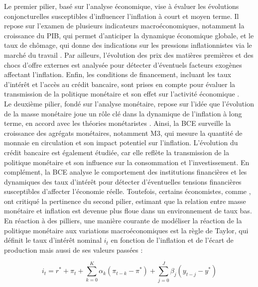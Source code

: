 Le premier pilier, basé sur l’analyse économique, vise à évaluer les évolutions conjoncturelles susceptibles d’influencer l’inflation à court et moyen terme. Il repose sur l’examen de plusieurs indicateurs macroéconomiques, notamment la croissance du PIB, qui permet d’anticiper la dynamique économique globale, et le taux de chômage, qui donne des indications sur les pressions inflationnistes via le marché du travail \citep{blanchard1986}. Par ailleurs, l’évolution des prix des matières premières et des chocs d’offre externes est analysée pour détecter d’éventuels facteurs exogènes affectant l’inflation. Enfin, les conditions de financement, incluant les taux d’intérêt et l’accès au crédit bancaire, sont prises en compte pour évaluer la transmission de la politique monétaire et son effet sur l’activité économique \citep{smets2003}.\\

Le deuxième pilier, fondé sur l’analyse monétaire, repose sur l’idée que l’évolution de la masse monétaire joue un rôle clé dans la dynamique de l’inflation à long terme, en accord avec les théories monétaristes \citep{friedman1968}. Ainsi, la BCE surveille la croissance des agrégats monétaires, notamment M3, qui mesure la quantité de monnaie en circulation et son impact potentiel sur l’inflation. L’évolution du crédit bancaire est également étudiée, car elle reflète la transmission de la politique monétaire et son influence sur la consommation et l’investissement. En complément, la BCE analyse le comportement des institutions financières et les dynamiques des taux d’intérêt pour détecter d’éventuelles tensions financières susceptibles d’affecter l’économie réelle. Toutefois, certains économistes, comme \citep{gali2008}, ont critiqué la pertinence du second pilier, estimant que la relation entre masse monétaire et inflation est devenue plus floue dans un environnement de taux bas.\\

En réaction à des pilliers, une manière courante de modéliser la réaction de la politique monétaire aux variations macroéconomiques est la règle de Taylor, qui définit le taux d'intérêt nominal $i_t$ en fonction de l'inflation et de l'écart de production mais aussi de ses valeurs passées :

\begin{equation}
i_t = r^* + \pi_t + \sum_{k=0}^{K} \alpha_k (\pi_{t-k} - \pi^*) + \sum_{j=0}^{J} \beta_j (y_{t-j} - y^*)
\end{equation}

